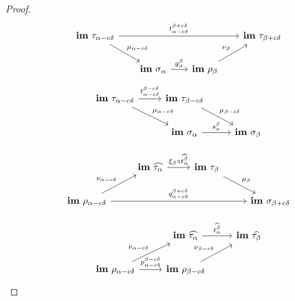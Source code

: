 \begin{proof}
  \begin{equation}\label{dgm:intrr1}\begin{tikzcd}[column sep=scriptsize]
    \im~\tau_{\alpha-c\of}  \arrow[to=Fb, "t_{\alpha-c\of}^{\beta+c\of}"]
                      \arrow[to=Ga, "\mu_{\alpha-c\of}"]
    & & & |[alias=Fb]|
      \im~\tau_{\beta+c\of} \\
    & |[alias=Ga]|
    \im~\sigma_\alpha \arrow[to=Gb, "g_\alpha^\beta"]
    & |[alias=Gb]|
      \im~\rho_\beta \arrow[to=Fb, "\nu_\beta"] &
  \end{tikzcd}\end{equation}
  \begin{equation}\label{dgm:intrr3}\begin{tikzcd}
    \im~\tau_{\alpha-c\of}  \arrow[to=Fb, "t_{\alpha-c\of}^{\beta-c\of}"]
                      \arrow[to=Ga, "\mu_{\alpha-c\of}"]
    & |[alias=Fb]|
      \im~\tau_{\beta-c\of} \arrow[to=Gb, "\mu_{\beta -c\of}"] \\
    & |[alias=Ga]|
    \im~\sigma_\alpha \arrow[to=Gb, "s_\alpha^\beta"]
    & |[alias=Gb]|
      \im~\sigma_\beta
  \end{tikzcd}\end{equation}

  \begin{equation}\label{dgm:intrr2}\begin{tikzcd}
    & |[alias=Fa]|
    \im~\ext{\tau_\alpha}  \arrow[to=Fb, "\xi_\beta\circ\ext{t_\alpha^\beta}"]
    & |[alias=Fb]|
      \im~\tau_\beta  \arrow[to=Gb, "\mu_\beta"] & \\
    \im~\rho_{\alpha-c\of}  \arrow[to=Gb, "q_{\alpha-c\of}^{\beta+c\of}"]
                      \arrow[to=Fa, "\nu_{\alpha-c\of}"]
    & & & |[alias=Gb]|
      \im~\sigma_{\beta + c\of}
  \end{tikzcd}\end{equation}

  \begin{equation}\label{dgm:intr4}\begin{tikzcd}
    & |[alias=Fa]|
    \im~\ext{\tau_\alpha}  \arrow[to=Fb, "\ext{t_\alpha^\beta}"]
    & |[alias=Fb]|
      \im~\ext{\tau_\beta}\\
    \im~\rho_{\alpha-c\of}  \arrow[to=Gb, "p_{\alpha-c\of}^{\beta-c\of}"]
                      \arrow[to=Fa, "\nu_{\alpha-c\of}"]
    & |[alias=Gb]|
      \im~\rho_{\beta - c\of} \arrow[to=Fb, "\nu_{\beta-c\of}"]&
  \end{tikzcd}\end{equation}


\end{proof}
